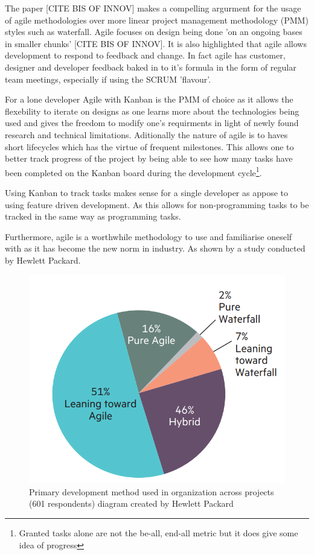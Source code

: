 The paper [CITE BIS OF INNOV] makes a compelling argurment for the usage of agile methodologies over more linear project management methodology (PMM) styles such as waterfall. Agile focuses on design being done 'on an ongoing bases in smaller chunks' [CITE BIS OF INNOV]. It is also highlighted that agile allows development to respond to feedback and change. In fact agile has customer, designer and developer feedback baked in to it's formula in the form of regular team meetings, especially if using the SCRUM 'flavour'.
\par
For a lone developer Agile with Kanban is the PMM of choice as it allows the flexebility to iterate on designs as one learns more about the technologies being used and gives the freedom to modify one's requirments in light of newly found research and technical limitations. Aditionally the nature of agile is to haves short lifecycles which has the virtue of frequent milestones. This allows one to better track progress of the project by being able to see how many tasks have been completed on the Kanban board during the development cycle\footnote[4]{Granted tasks alone are not the be-all, end-all metric but it does give some idea of progress}.
\par
Using Kanban to track tasks makes sense for a single developer as appose to using feature driven development. As this allows for non-programming tasks to be tracked in the same way as programming tasks.
\par
Furthermore, agile is a worthwhile methodology to use and familiarise oneself with as it has become the new norm in industry. As shown by a study conducted by Hewlett Packard.

\begin{figure}[H]
  \begin{center}
    \includegraphics[scale=0.4]{Images/PMMPieChart}
    \caption{Primary development method used in organization across projects (601 respondents) diagram created by Hewlett Packard}
    \label{fig:PMM_PieChart}
  \end{center}
\end{figure}

